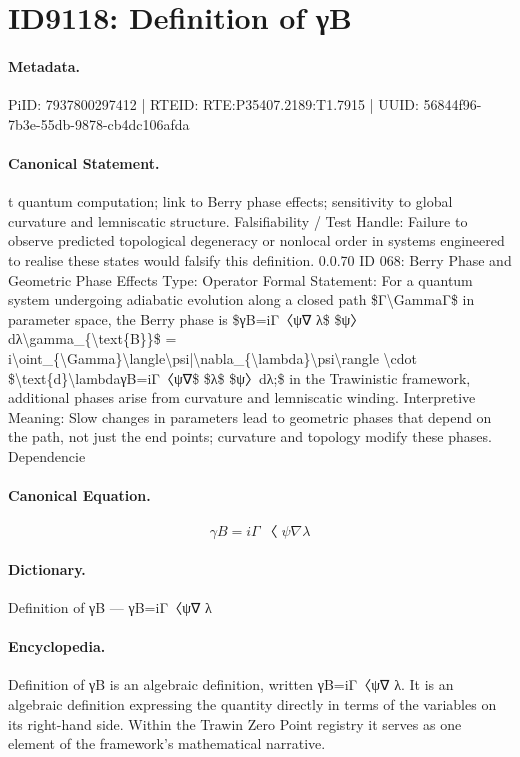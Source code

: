 \section*{ID9118: Definition of γB}
\paragraph{Metadata.}
PiID: 7937800297412 | RTEID: RTE:P35407.2189:T1.7915 | UUID: 56844f96-7b3e-55db-9878-cb4dc106afda

\paragraph{Canonical Statement.}
t quantum computation; link to Berry phase effects; sensitivity to global curvature and lemniscatic structure. Falsifiability / Test Handle: Failure to observe predicted topological degeneracy or nonlocal order in systems engineered to realise these states would falsify this definition. 0.0.70 ID 068: Berry Phase and Geometric Phase Effects Type: Operator Formal Statement: For a quantum system undergoing adiabatic evolution along a closed path \$Γ\textbackslash{}GammaΓ\$ in parameter space, the Berry phase is \$γB=iΓ〈ψ∇ λ\$ \$ψ〉dλ\textbackslash{}gamma\_\{\textbackslash{}text\{B\}\}\$ = i\textbackslash{}oint\_\{\textbackslash{}Gamma\}\textbackslash{}langle\textbackslash{}psi|\textbackslash{}nabla\_\{\textbackslash{}lambda\}\textbackslash{}psi\textbackslash{}rangle \textbackslash{}cdot \$\textbackslash{}text\{d\}\textbackslash{}lambdaγB=iΓ〈ψ∇\$ \$λ\$ \$ψ〉dλ;\$ in the Trawinistic framework, additional phases arise from curvature and lemniscatic winding. Interpretive Meaning: Slow changes in parameters lead to geometric phases that depend on the path, not just the end points; curvature and topology modify these phases. Dependencie

\paragraph{Canonical Equation.}
\[
γB=iΓ〈ψ∇ λ
\]

\paragraph{Dictionary.}
Definition of γB — γB=iΓ〈ψ∇ λ

\paragraph{Encyclopedia.}
Definition of γB is an algebraic definition, written γB=iΓ〈ψ∇ λ. It is an algebraic definition expressing the quantity directly in terms of the variables on its right-hand side. Within the Trawin Zero Point registry it serves as one element of the framework's mathematical narrative.
